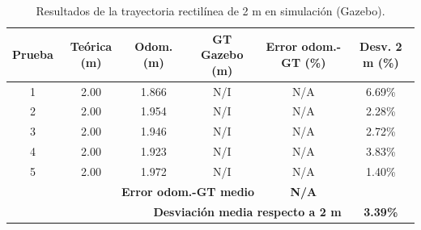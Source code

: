 \begin{table}[H]
\centering
\caption{Resultados de la trayectoria rectil\'inea de 2 m en simulaci\'on (Gazebo).}
\label{tab:odom_recta_sim}
\small
\begin{tabular}{cccccc}
\hline
\textbf{Prueba} & \textbf{Te\'orica (m)} & \textbf{Odom. (m)} & \textbf{GT Gazebo (m)} & \textbf{Error odom.-GT (\%)} & \textbf{Desv. 2 m (\%)} \\
\hline
1 & 2.00 & 1.866 & N/I & N/A & 6.69\% \\
2 & 2.00 & 1.954 & N/I & N/A & 2.28\% \\
3 & 2.00 & 1.946 & N/I & N/A & 2.72\% \\
4 & 2.00 & 1.923 & N/I & N/A & 3.83\% \\
5 & 2.00 & 1.972 & N/I & N/A & 1.40\% \\
\hline
\multicolumn{4}{r}{\textbf{Error odom.-GT medio}} & \textbf{N/A} & \\
\multicolumn{5}{r}{\textbf{Desviaci\'on media respecto a 2 m}} & \textbf{3.39\%} \\
\hline
\end{tabular}
\end{table}